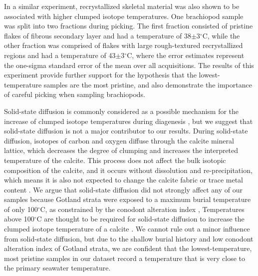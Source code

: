 \documentclass[5p, authoryear]{elsarticle}
\begin{document}
In a similar experiment, recrystallized skeletal material was also shown to be associated with higher clumped isotope temperatures. One brachiopod sample was split into two fractions during picking. The first fraction consisted of pristine flakes of fibrous secondary layer and had a temperature of 38$\pm$3$^{\circ}$C, while the other fraction was comprised of flakes with large rough-textured recrystallized regions and had a temperature of 43$\pm$3$^{\circ}$C, where the error estimates represent the one-sigma standard error of the mean over all acquisitions. The results of this experiment provide further support for the hypothesis that the lowest-temperature samples are the most pristine, and also demonstrate the importance of careful picking when sampling brachiopods.  

Solid-state diffusion is commonly considered as a possible mechanism for the increase of clumped isotope temperatures during diagenesis \citep{Dennis2013, Huntington2011, Quade2013, VanDeVelde2013}, but we suggest that solid-state diffusion is not a major contributor to our results. During solid-state diffusion, isotopes of carbon and oxygen diffuse through the calcite mineral lattice, which decreases the degree of clumping and increases the interpreted temperature of the calcite. This process does not affect the bulk isotopic composition of the calcite, and it occurs without dissolution and re-precipitation, which means it is also not expected to change the calcite fabric or trace metal content \citep{Eiler2011}. We argue that solid-state diffusion did not strongly affect any of our samples because Gotland strata were exposed to a maximum burial temperature of only 100$^{\circ}$C, as constrained by the conodont alteration index \citep{Jeppsson1983, Wenzel2000}, Temperatures above 100$^{\circ}$C are thought to be required for solid-state diffusion to increase the clumped isotope temperature of a calcite \citep{Dennis2010}. We cannot rule out a minor influence from solid-state diffusion, but due to the shallow burial history and low conodont alteration index of Gotland strata, we are confident that the lowest-temperature, most pristine samples in our dataset record a temperature that is very close to the primary seawater temperature. 
\end{document}
